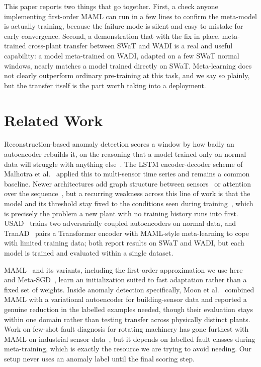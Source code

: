\documentclass[conference]{IEEEtran}
\begin{document}
This paper reports two things that go together. First, a check anyone
implementing first-order MAML can run in a few lines to confirm the
meta-model is actually training, because the failure mode is silent and
easy to mistake for early convergence. Second, a demonstration that with the
fix in place, meta-trained cross-plant transfer between SWaT and WADI is a
real and useful capability: a model meta-trained on WADI, adapted on a few
SWaT normal windows, nearly matches a model trained directly on SWaT.
Meta-learning does not clearly outperform ordinary pre-training at this
task, and we say so plainly, but the transfer itself is the part worth
taking into a deployment.

\section{Related Work}

Reconstruction-based anomaly detection scores a window by how badly an
autoencoder rebuilds it, on the reasoning that a model trained only on
normal data will struggle with anything else~\cite{pang2021}. The LSTM
encoder-decoder scheme of Malhotra et al.~\cite{malhotra2016} applied this
to multi-sensor time series and remains a common baseline. Newer
architectures add graph structure between sensors~\cite{deng2021} or
attention over the sequence~\cite{chen2022}, but a recurring weakness across
this line of work is that the model and its threshold stay fixed to the
conditions seen during training~\cite{correia2024}, which is precisely the
problem a new plant with no training history runs into first.
USAD~\cite{audibert2020} trains two adversarially coupled autoencoders on
normal data, and TranAD~\cite{tuli2022} pairs a Transformer encoder with
MAML-style meta-learning to cope with limited training data; both report
results on SWaT and WADI, but each model is trained and evaluated within a
single dataset.

MAML~\cite{finn2017} and its variants, including the first-order
approximation we use here~\cite{antoniou2019} and Meta-SGD~\cite{li2017},
learn an initialization suited to fast adaptation rather than a fixed set of
weights. Inside anomaly detection specifically, Moon et al.~\cite{moon2023}
combined MAML with a variational autoencoder for building-sensor data and
reported a genuine reduction in the labelled examples needed, though their
evaluation stays within one domain rather than testing transfer across
physically distinct plants. Work on few-shot fault diagnosis for rotating
machinery has gone furthest with MAML on industrial sensor
data~\cite{zhang2021}, but it depends on labelled fault classes during
meta-training, which is exactly the resource we are trying to avoid needing.
Our setup never uses an anomaly label until the final scoring step.
\end{document}
